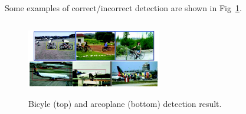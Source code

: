 Some examples of correct/incorrect detection are shown in Fig~\ref{fig:bicyle_plane_example}. 
\begin{figure}[ht]
  \centering
  \includegraphics[width=2.3in,height=1.3in]{images/bicycle_plane_example.jpg}
  \caption{Bicyle (top) and areoplane (bottom) detection result.}
  \label{fig:bicyle_plane_example}
\end{figure}
